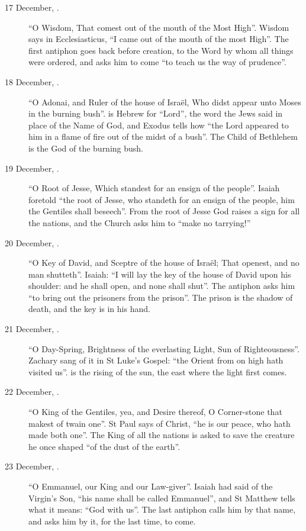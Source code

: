 \begin{description}

\item[17 December, .] ``O Wisdom, That comest out of the
mouth of the Most High''. Wisdom says in Ecclesiasticus, ``I came out of the
mouth of the most High''. The first antiphon goes back before creation, to the
Word by whom all things were ordered, and asks him to come ``to teach us the
way of prudence''.

\item[18 December, .] ``O Adonai, and Ruler of the house of
Israël, Who didst appear unto Moses in the burning bush''.  is
Hebrew for ``Lord'', the word the Jews said in place of the Name of God, and
Exodus tells how ``the Lord appeared to him in a flame of fire out of the midst
of a bush''. The Child of Bethlehem is the God of the burning bush.

\item[19 December, .] ``O Root of Jesse, Which standest
for an ensign of the people''. Isaiah foretold ``the root of Jesse, who
standeth for an ensign of the people, him the Gentiles shall beseech''. From
the root of Jesse God raises a sign for all the nations, and the Church asks
him to ``make no tarrying!''

\item[20 December, .] ``O Key of David, and Sceptre of the
house of Israël; That openest, and no man shutteth''. Isaiah: ``I will lay the
key of the house of David upon his shoulder: and he shall open, and none shall
shut''. The antiphon asks him ``to bring out the prisoners from the prison''. The
prison is the shadow of death, and the key is in his hand.

\item[21 December, .] ``O Day-Spring, Brightness of the
everlasting Light, Sun of Righteousness''. Zachary sang of it in St Luke's
Gospel: ``the Orient from on high hath visited us''.  is the
rising of the sun, the east where the light first comes.

\item[22 December, .] ``O King of the Gentiles, yea, and
Desire thereof, O Corner-stone that makest of twain one''. St Paul says of
Christ, ``he is our peace, who hath made both one''. The King of all the
nations is asked to save the creature he once shaped ``of the dust of the
earth''.

\item[23 December, .] ``O Emmanuel, our King and our
Law-giver''. Isaiah had said of the Virgin's Son, ``his name shall be called
Emmanuel'', and St Matthew tells what it means: ``God with us''. The
last antiphon calls him by that name, and asks him by it, for the last time, to
come.

\end{description}

